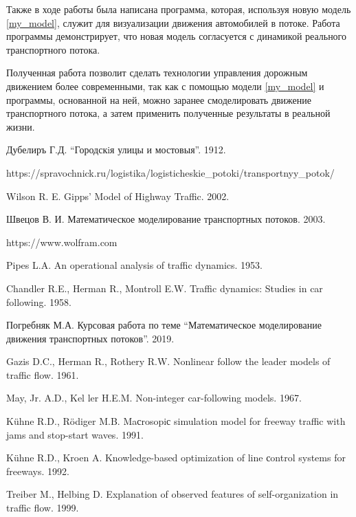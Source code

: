 \documentclass[12pt, a4paper]{extarticle}
\numberwithin{equation}{section}
\numberwithin{figure}{section}
\begin{document}
Также в ходе работы была написана программа, которая, используя новую модель \eqref{my_model}, служит для визуализации движения автомобилей в потоке. Работа программы демонстрирует, что новая модель согласуется с динамикой реального транспортного потока.

Полученная работа позволит сделать технологии управления дорожным движением более современными, так как с помощью модели \eqref{my_model} и программы, основанной на ней, можно заранее смоделировать движение транспортного потока, а затем применить полученные результаты в реальной жизни.
\newpage

\begin{thebibliography}{**}
	Дубелиръ Г.Д. ``Городскiя улицы и мостовыя''. 1912.
	
	https://spravochnick.ru/logistika/logisticheskie\_potoki/transportnyy\_potok/
	
	Wilson R. E. Gipps’ Model of Highway Traffic. 2002.
	
	Швецов В. И. Математическое моделирование транспортных потоков. 2003. 
	
	https://www.wolfram.com
	
	Pipes L.A. An operational analysis of traffic dynamics. 1953. 
		
	Chandler R.E., Herman R., Montroll E.W. Traffic dynamics: Studies in car following. 1958.
	
	Погребняк М.А. Курсовая работа по теме ``Математическое моделирование движения транспортных потоков''. 2019.
	
	Gazis D.C., Herman R., Rothery R.W. Nonlinear follow the leader models of traffic flow. 1961.
	
	May, Jr. A.D., Kel ler H.E.M. Non-integer car-following models. 1967.
	
	K\"{u}hne R.D., R\"{o}diger M.B. Maсrosopiс simulation model for freeway traffic with jams
	and stop-start waves. 1991.
	
	K\"{u}hne R.D., Kroen A. Knowledge-based optimization of line сontrol systems for freeways. 1992.

	Treiber M., Helbing D. Explanation of observed features of self-organization in traffic flow.
	1999.
	

\end{thebibliography}
\end{document}
